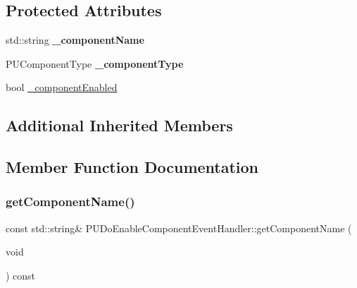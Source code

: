 \subsection*{Protected Attributes}
\begin{DoxyCompactItemize}
\item 
\mbox{\label{classPUDoEnableComponentEventHandler_a8ae94ae2e1420751c175fcf7bccd4a4e}} 
std\+::string {\bfseries \+\_\+component\+Name}
\item 
\mbox{\label{classPUDoEnableComponentEventHandler_a26594991e6115ad2936e2bcd4245176b}} 
P\+U\+Component\+Type {\bfseries \+\_\+component\+Type}
\item 
bool \hyperlink{classPUDoEnableComponentEventHandler_a25a6b692041994ae3e3f6716f74b1095}{\+\_\+component\+Enabled}
\end{DoxyCompactItemize}
\subsection*{Additional Inherited Members}


\subsection{Member Function Documentation}
\mbox{\label{classPUDoEnableComponentEventHandler_a23bf802ebb2b12be1d98c2841a2f62ea}} 
\subsubsection{\texorpdfstring{get\+Component\+Name()}{getComponentName()}\hspace{0.1cm}{\footnotesize\ttfamily [1/2]}}
{\footnotesize\ttfamily const std\+::string\& P\+U\+Do\+Enable\+Component\+Event\+Handler\+::get\+Component\+Name (\begin{DoxyParamCaption}\item[{void}]{ }\end{DoxyParamCaption}) const\hspace{0.3cm}{\ttfamily [inline]}}

